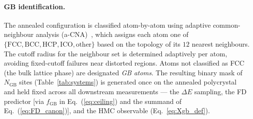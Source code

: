 
\paragraph*{GB identification.}
The annealed configuration is classified atom-by-atom using adaptive
common-neighbour analysis (a-CNA)~\cite{Stukowski2012}, which assigns
each atom one of $\{\text{FCC}, \text{BCC}, \text{HCP}, \text{ICO},
\text{other}\}$ based on the topology of its $12$ nearest neighbours.
The cutoff radius for the neighbour set is determined adaptively per
atom, avoiding fixed-cutoff failures near distorted regions. Atoms
not classified as FCC (the bulk lattice phase) are designated
\emph{GB atoms}. The resulting binary mask of $N_\mathrm{GB}$ sites
(Table~\ref{tab:systems}) is generated once on the annealed polycrystal
and held fixed across all downstream measurements — the $\Delta E$
sampling, the FD predictor [via $f_\mathrm{GB}$ in
Eq.~(\ref{eq:ceiling}) and the summand of Eq.~(\ref{eq:FD_canon})],
and the HMC observable (Eq.~\ref{eq:Xgb_def}).



